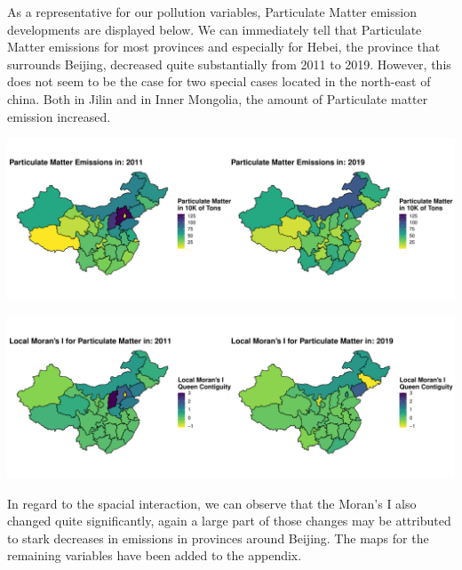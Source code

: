 \documentclass[
]{article}
\begin{document}
	As a representative for our pollution variables, Particulate Matter emission developments are displayed below. We can immediately tell that Particulate Matter emissions for most provinces and especially for Hebei, the province that surrounds Beijing, decreased quite substantially from 2011 to 2019. However, this does not seem to be the case for two special cases located in the north-east of china. Both in Jilin and in Inner Mongolia, the amount of Particulate matter emission increased.
	\begin{center}
		\includegraphics[width = 440pt]{Waste_Gas_Emissions_Particular_Matter_comp.pdf} 
	\end{center}
	\begin{center}
		\includegraphics[width = 440pt]{Ii_Waste_Gas_Emissions_Particular_Matter_comp.pdf} 
	\end{center}
	In regard to the spacial interaction, we can observe that the Moran's I also changed quite significantly, again a large part of those changes may be attributed to stark decreases in emissions in provinces around Beijing. The maps for the remaining variables have been added to the appendix.
\end{document}
